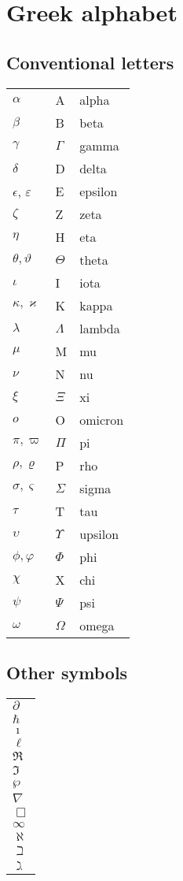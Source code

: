 \chapter{Greek alphabet}

\section{Conventional letters}
\begin{longtable}{l| l| l} 
    $\alpha$ & A & alpha \\
    $\beta$ & B & beta \\
    $\gamma$ & $\Gamma$  & gamma \\
    $\delta$ & D  & delta \\
    $\epsilon$, $\varepsilon$ & E & epsilon \\
    $\zeta$ & Z & zeta \\
    $\eta$ & H & eta \\
    $\theta, \vartheta$ & $\Theta$ & theta \\
    $\iota$ & I & iota \\
    $\kappa, \varkappa$ & K & kappa \\
    $\lambda$ & $\Lambda$ & lambda \\
    $\mu$ & M & mu \\
    $\nu$ & N & nu \\
    $\xi$ & $\Xi$ & xi \\
    $o$ & O & omicron \\
    $\pi, \varpi$ & $\Pi$ & pi \\
    $\rho, \varrho $ & P & rho \\
    $\sigma, \varsigma$ & $\Sigma$ & sigma \\
    $\tau$ & T & tau \\
    $\upsilon$ & $\Upsilon$ & upsilon \\
    $\phi, \varphi$ & $\Phi$ & phi \\
    $\chi$ & X & chi \\
    $\psi$ & $\Psi$ & psi \\
    $\omega$ & $\Omega$ & omega \\
\end{longtable}

\section{Other symbols}
\begin{longtable}{l}
    $\partial$ \\
    $\hbar$ \\
    $\imath$ \\
    $\ell$ \\
    $\Re$ \\
    $\Im$ \\
    $\wp$ \\
    $\nabla$ \\
    $\Box$ \\
    $\infty$ \\
    $\aleph$ \\
    $\beth$ \\
    $\gimel$ \\

\end{longtable}
